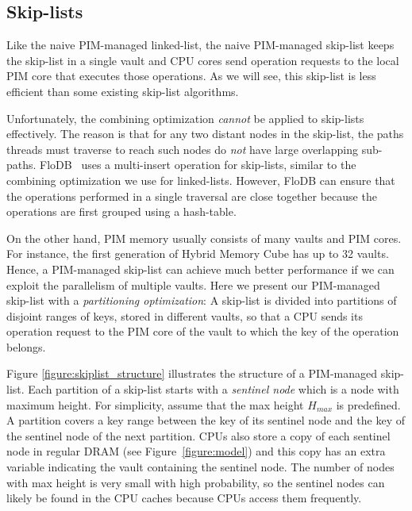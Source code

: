 \subsection{Skip-lists}
\label{section:skip_list}


Like the naive PIM-managed linked-list,
the naive PIM-managed skip-list keeps the skip-list in a single vault and
CPU cores send operation requests to the local PIM core that executes those operations.
As we will see, this skip-list is less efficient than some existing skip-list algorithms.

Unfortunately, the combining optimization \emph{cannot} be applied to skip-lists effectively.
The reason is that for any two distant nodes in the skip-list,
the paths threads must traverse to reach such nodes do \emph{not} have large overlapping sub-paths. 
FloDB~\cite{flodb} uses a multi-insert operation for skip-lists, similar to the combining 
optimization we use for linked-lists. However, FloDB can ensure that the operations performed in 
a single traversal are close together because the operations are first grouped using a hash-table.  

On the other hand, PIM memory usually consists of many vaults and PIM cores.
For instance, the first generation of Hybrid Memory Cube \cite{website:HMC} has up to 32 vaults.
Hence, a PIM-managed skip-list can achieve much better performance if
we can exploit the parallelism of multiple vaults.
Here we present our PIM-managed skip-list with a \textit{partitioning optimization}:
A skip-list is divided into partitions of disjoint ranges of keys,
stored in different vaults, so that a CPU sends its operation request to
the PIM core of the vault to which the key of the operation belongs.

Figure \ref{figure:skiplist_structure} illustrates the structure of a PIM-managed skip-list.
Each partition of a skip-list starts with a \textit{sentinel node}
which is a node with maximum height. 
For simplicity, assume that the max height $H_{max}$ is predefined.
A partition covers a key range between the key of its sentinel node and
the key of the sentinel node of the next partition.
CPUs also store a copy of each sentinel node in regular DRAM (see Figure~\ref{figure:model}) and 
this copy has an extra variable indicating the vault containing the sentinel node.
The number of nodes with max height is very small with high probability, 
so the sentinel nodes can likely be found in the CPU caches  
because CPUs access them frequently.

